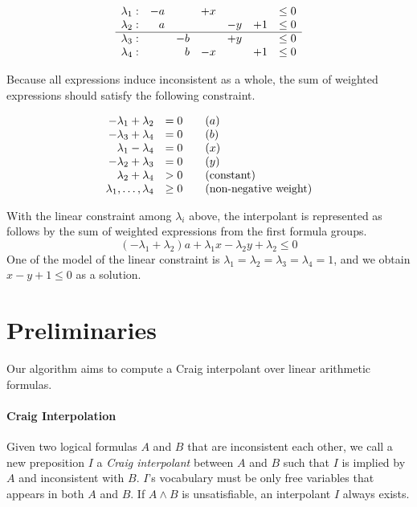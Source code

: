 \begin{align*}
\begin{array}{r r r r r r l}
\lambda_1 : & -a & & +x & & & \leq 0 \\
\lambda_2 : & a & & & -y & +1 & \leq 0 \\
\hline
\lambda_3 : & & -b & & +y & & \leq 0 \\
\lambda_4 : & & b & -x & & +1 & \leq 0
\end{array}
\end{align*}

Because all expressions induce inconsistent as a whole, the sum of
weighted expressions should satisfy the following constraint.

\begin{align*}
\begin{array}{r l l}
- \lambda_1 + \lambda_2 & = 0 \quad & (a) \\
- \lambda_3 + \lambda_4 & = 0 & (b) \\
  \lambda_1 - \lambda_4 & = 0 & (x) \\
- \lambda_2 + \lambda_3 & = 0 & (y) \\
  \lambda_2 + \lambda_4 & > 0 & (\text{constant}) \\
\lambda_1, \ldots, \lambda_4 & \geq 0 & (\text{non-negative weight})
\end{array}
\end{align*}

With the linear constraint among $\lambda_i$ above, the interpolant is
represented as follows by the sum of weighted expressions from the
first formula groups.
\[ (- \lambda_1 + \lambda_2) a + \lambda_1 x - \lambda_2 y + \lambda_2 \leq 0 \]
One of the model of the linear constraint is $\lambda_1 = \lambda_2 =
\lambda_3 = \lambda_4 = 1$, and we obtain $x-y+1 \leq 0$ as a
solution.



\section{Preliminaries}

Our algorithm aims to compute a Craig interpolant over linear
arithmetic formulas.


\paragraph{Craig Interpolation}
Given two logical formulas $A$ and $B$ that are inconsistent each
other, we call a new preposition $I$ a \emph{Craig interpolant}
\cite{journals/jsyml/Craig57} between $A$ and $B$ such that $I$ is
implied by $A$ and inconsistent with $B$.  $I$'s vocabulary must be
only free variables that appears in both $A$ and $B$.  If $A \wedge B$
is unsatisfiable, an interpolant $I$ always exists.

